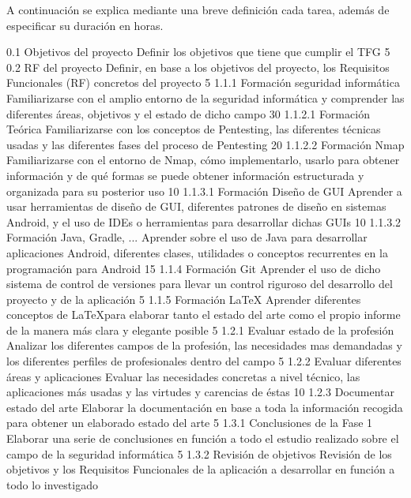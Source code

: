 A continuación se explica mediante una breve definición cada tarea, además de especificar su duración en horas.

\taskframe
	{0.1}
	{Objetivos del proyecto}
	{Definir los objetivos que tiene que cumplir el TFG}
	{5}
\taskframe
	{0.2}
	{RF del proyecto}
	{Definir, en base a los objetivos del proyecto, los Requisitos Funcionales (RF) concretos del proyecto}
	{5}
\taskframe
	{1.1.1}
	{Formación seguridad informática}
	{Familiarizarse con el amplio entorno de la seguridad informática y comprender las diferentes áreas, objetivos y el estado de dicho campo}
	{30}
\taskframe
	{1.1.2.1}
	{Formación Teórica}
	{Familiarizarse con los conceptos de Pentesting, las diferentes técnicas usadas y las diferentes fases del proceso de Pentesting}
	{20}
\taskframe
	{1.1.2.2}
	{Formación Nmap}
	{Familiarizarse con el entorno de Nmap, cómo implementarlo, usarlo para obtener información y de qué formas se puede obtener información estructurada y organizada para su posterior uso}
	{10}
\taskframe
	{1.1.3.1}
	{Formación Diseño de GUI}
	{Aprender a usar herramientas de diseño de GUI, diferentes patrones de diseño en sistemas Android, y el uso de IDEs o herramientas para desarrollar dichas GUIs}
	{10}
\taskframe
	{1.1.3.2}
	{Formación Java, Gradle, ...}
	{Aprender sobre el uso de Java para desarrollar aplicaciones Android, diferentes clases, utilidades o conceptos recurrentes en la programación para Android}
	{15}
\taskframe
	{1.1.4}
	{Formación Git}
	{Aprender el uso de dicho sistema de control de versiones para llevar un control riguroso del desarrollo del proyecto y de la aplicación}
	{5}
\taskframe
	{1.1.5}
	{Formación \LaTeX}
	{Aprender diferentes conceptos de \LaTeX para elaborar tanto el estado del arte como el propio informe de la manera más clara y elegante posible}
	{5}
\taskframe
	{1.2.1}
	{Evaluar estado de la profesión}
	{Analizar los diferentes campos de la profesión, las necesidades mas demandadas y los diferentes perfiles de profesionales dentro del campo}
	{5}
\taskframe
	{1.2.2}
	{Evaluar diferentes áreas y aplicaciones}
	{Evaluar las necesidades concretas a nivel técnico, las aplicaciones más usadas y las virtudes y carencias de éstas}
	{10}
\taskframe
	{1.2.3}
	{Documentar estado del arte}
	{Elaborar la documentación en base a toda la información recogida para obtener un elaborado estado del arte}
	{5}
\taskframe
	{1.3.1}
	{Conclusiones de la Fase 1}
	{Elaborar una serie de conclusiones en función a todo el estudio realizado sobre el campo de la seguridad informática}
	{5}
\taskframe
	{1.3.2}
	{Revisión de objetivos}
	{Revisión de los objetivos y los Requisitos Funcionales de la aplicación a desarrollar en función a todo lo investigado}
